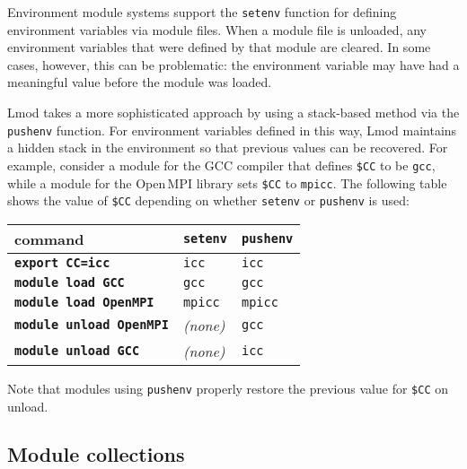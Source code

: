 Environment module systems support the \texttt{\small setenv} function for 
defining environment variables via module files. When a module file is unloaded,
any environment variables that were defined by that module are cleared. In some cases, however, this can be problematic: the environment variable may have had a meaningful value before the module was loaded.

Lmod takes a more sophisticated approach by using a stack-based
method via the \texttt{\small pushenv} function. For environment
variables defined in this way, Lmod maintains a hidden stack in the environment
so that previous values can be recovered.
For example, consider a module for the GCC compiler that
defines \texttt{\small \$CC} to be \texttt{\small gcc}, while a module for the
Open\,MPI library sets \texttt{\small \$CC} to
\texttt{\small mpicc}. The following table shows the value of \texttt{\small \$CC}
depending on whether \texttt{\small setenv} or \texttt{\small pushenv} is used:
\begin{center}
 \begin{tabular}{l|l|l}
 command                                 & \texttt{\small setenv} & \texttt{\small pushenv}\\
 \hline
 \textbf{\texttt{\small export CC=icc}}  & \texttt{\small icc}  & \texttt{\small icc} \\
 \textbf{\texttt{\small module load   GCC}}   & \texttt{\small gcc}    & \texttt{\small gcc}  \\
 \textbf{\texttt{\small module load   OpenMPI}} & \texttt{\small mpicc}  & \texttt{\small mpicc} \\
 \textbf{\texttt{\small module unload OpenMPI}} & \emph{(none)}   & \texttt{\small gcc}  \\
 \textbf{\texttt{\small module unload GCC}}   & \emph{(none)}   & \texttt{\small icc} \\
  \hline
    \end{tabular}
\end{center}
\noindent
Note that modules using \texttt{\small pushenv} properly restore the previous value for \texttt{\small\$CC} on unload.


\subsection{Module collections}


